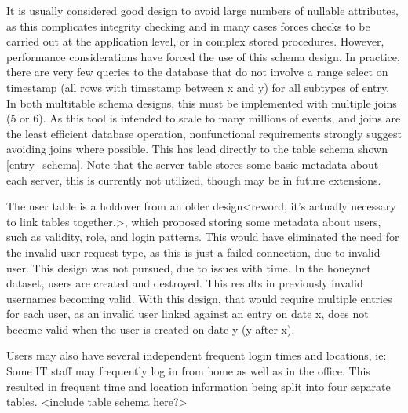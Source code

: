 It is usually considered good design to avoid large numbers of nullable attributes, as this complicates integrity checking and in many cases forces checks to be carried out at the application level, or in complex stored procedures. However, performance considerations have forced the use of this schema design. In practice, there are very few queries to the database that do not involve a range select on timestamp (all rows with timestamp between x and y) for all subtypes of entry. In both multitable schema designs, this must be implemented with multiple joins (5 or 6). As this tool is intended to scale to many millions of events, and joins are the least efficient database operation, nonfunctional requirements strongly suggest avoiding joins where possible. This has lead directly to the table schema shown \ref{entry_schema}. Note that the server table stores some basic metadata about each server, this is currently not utilized, though may be in future extensions.

The user table is a holdover from an older design<reword, it's actually necessary to link tables together.>, which proposed storing some metadata about users, such as validity, role, and login patterns. This would have eliminated the need for the invalid user request type, as this is just a failed connection, due to invalid user. This design was not pursued, due to issues with time. In the honeynet dataset, users are created and destroyed. This results in previously invalid usernames becoming valid. With this design, that would require multiple entries for each user, as an invalid user linked against an entry on date x, does not become valid when the user is created on date y (y after x).

Users may also have several independent frequent login times and locations, ie: Some IT staff may frequently log in from home as well as in the office. This resulted in frequent time and location information being split into four separate tables. <include table schema here?>

